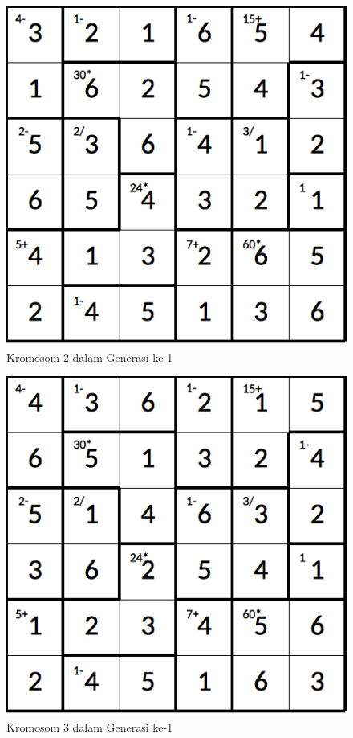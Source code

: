 \begin{figure}
\centering
\captionsetup{justification=centering}
\includegraphics[scale=0.333]{Gambar/hybridgenetic/Generation1Chromosome2}
\caption[Kromosom 2 dalam Generasi ke-1]{Kromosom 2 dalam Generasi ke-1}
\label{fig:analisisg1k2}
\end{figure}

\begin{figure}
\centering
\captionsetup{justification=centering}
\includegraphics[scale=0.333]{Gambar/hybridgenetic/Generation1Chromosome3}
\caption[Kromosom 3 dalam Generasi ke-1]{Kromosom 3 dalam Generasi ke-1}
\label{fig:analisisg1k3}
\end{figure}

